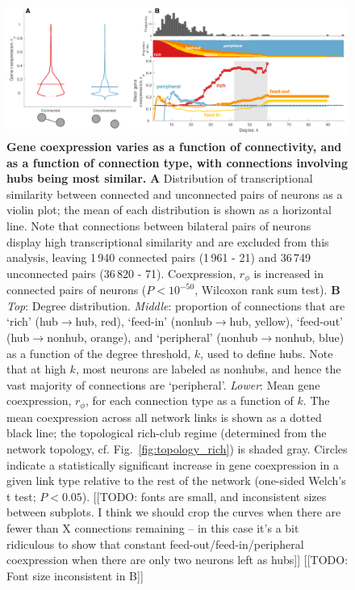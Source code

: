 \documentclass[10pt,letterpaper]{article}
\begin{document}
 \begin{figure}[h]
 \centering
    \includegraphics[width=1\textwidth]{MeanCoexpression.pdf}
 \caption{{\bf Gene coexpression varies as a function of connectivity, and as a function of connection type, with connections involving hubs being most similar.}
\textbf{A} Distribution of transcriptional similarity between connected and unconnected pairs of neurons as a violin plot; the mean of each distribution is shown as a horizontal line.
Note that connections between bilateral pairs of neurons display high transcriptional similarity and are excluded from this analysis, leaving 1\,940 connected pairs (1\,961 - 21) and 36\,749 unconnected pairs (36\,820 - 71).
Coexpression, $r_\phi$ is increased in connected pairs of neurons ($P < 10^{-50}$, Wilcoxon rank sum test).
\textbf{B}
\emph{Top}: Degree distribution.
\emph{Middle}: proportion of connections that are `rich' (hub$\rightarrow$hub, red), `feed-in' (nonhub$\rightarrow$hub, yellow), `feed-out' (hub$\rightarrow$nonhub, orange), and `peripheral' (nonhub$\rightarrow$nonhub, blue) as a function of the degree threshold, $k$, used to define hubs.
Note that at high $k$, most neurons are labeled as nonhubs, and hence the vast majority of connections are `peripheral'.
\emph{Lower}: Mean gene coexpression, $r_\phi$, for each connection type as a function of $k$.
The mean coexpression across all network links is shown as a dotted black line; the topological rich-club regime (determined from the network topology, cf. Fig.~\ref{fig:topology_rich}) is shaded gray.
Circles indicate a statistically significant increase in gene coexpression in a given link type relative to the rest of the network (one-sided Welch’s t test; $P < 0.05$).
[[TODO: fonts are small, and inconsistent sizes between subplots.
I think we should crop the curves when there are fewer than X connections remaining -- in this case it's a bit ridiculous to show that constant feed-out/feed-in/peripheral coexpression when there are only two neurons
left as hubs]]
[[TODO: Font size inconsistent in B]]
}
 \label{fig:coExp}
\end{figure}
\end{document}
